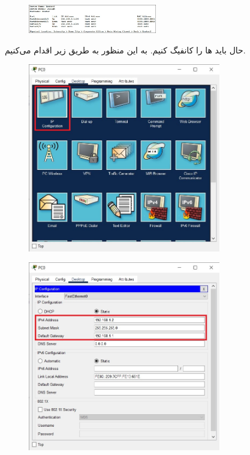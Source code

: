 \documentclass{article}
\begin{document}
\begin{figure}[H]
    \centering
    \includegraphics[width=0.5\textwidth]{figures/10.jpg}
    \caption{}
    \label{fig:fig1}
\end{figure}
حال باید ها را کانفیگ کنیم. به این منظور به طریق زیر اقدام می‌کنیم.
\begin{figure}[H]
    \centering
    \includegraphics[width=0.75\textwidth]{figures/11.jpg}
    \caption{}
    \label{fig:fig1}
\end{figure}
\begin{figure}[H]
    \centering
    \includegraphics[width=0.75\textwidth]{figures/12.jpg}
    \caption{}
    \label{fig:fig1}
\end{figure}
\end{document}
